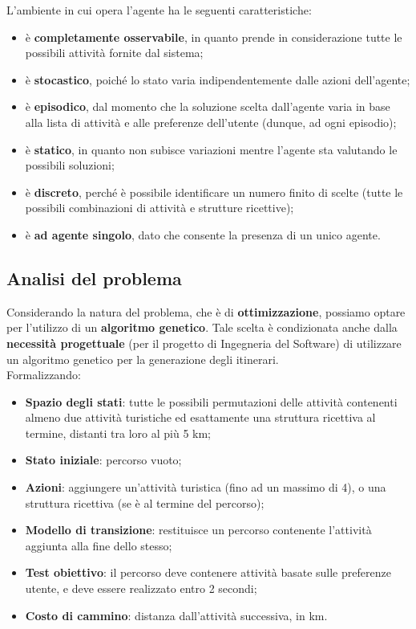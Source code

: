 \documentclass{CSUniSchoolLabReport}
\begin{document}
L'ambiente in cui opera l'agente ha le seguenti caratteristiche:
\begin{itemize}
 \item è \textbf{completamente osservabile}, in quanto prende in considerazione tutte le possibili attività fornite dal sistema;
 \item è \textbf{stocastico}, poiché lo stato varia indipendentemente dalle azioni dell'agente;
 \item è \textbf{episodico}, dal momento che la soluzione scelta dall'agente varia in base alla lista di attività e alle preferenze dell'utente (dunque, ad ogni episodio);
 \item è \textbf{statico}, in quanto non subisce variazioni mentre l'agente sta valutando le possibili soluzioni;
 \item è \textbf{discreto}, perché è possibile identificare un numero finito di scelte (tutte le possibili combinazioni di attività e strutture ricettive);
 \item è \textbf{ad agente singolo}, dato che consente la presenza di un unico agente.
\end{itemize}

\pagebreak

\subsection{Analisi del problema}

Considerando la natura del problema, che è di \textbf{ottimizzazione}, possiamo optare per l'utilizzo di un \textbf{algoritmo genetico}. Tale scelta è condizionata anche dalla \textbf{necessità progettuale} (per il progetto di Ingegneria del Software) di utilizzare un algoritmo genetico per la generazione degli itinerari. \\
Formalizzando:
\begin{itemize}
    \item \textbf{Spazio degli stati}: tutte le possibili permutazioni delle attività contenenti almeno due attività turistiche ed esattamente una struttura ricettiva al termine, distanti tra loro al più 5 km;
    \item \textbf{Stato iniziale}: percorso vuoto;
    \item \textbf{Azioni}: aggiungere un'attività turistica (fino ad un massimo di 4), o una struttura ricettiva (se è al termine del percorso);
    \item \textbf{Modello di transizione}: restituisce un percorso contenente l'attività aggiunta alla fine dello stesso;
    \item \textbf{Test obiettivo}: il percorso deve contenere attività basate sulle preferenze utente, e deve essere realizzato entro 2 secondi;
    \item \textbf{Costo di cammino}: distanza dall'attività successiva, in km.
\end{itemize}
\end{document}
